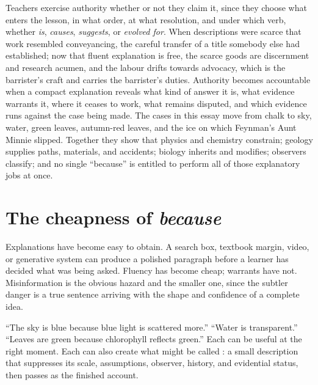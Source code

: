 
\begin{thesisbox}
Teachers exercise authority whether or not they claim it, since they choose what enters the lesson, in what order, at what resolution, and under which verb, whether \emph{is}, \emph{causes}, \emph{suggests}, or \emph{evolved for}. When descriptions were scarce that work resembled conveyancing, the careful transfer of a title somebody else had established; now that fluent explanation is free, the scarce goods are discernment and research acumen, and the labour drifts towards advocacy, which is the barrister's craft and carries the barrister's duties. Authority becomes accountable when a compact explanation reveals what kind of answer it is, what evidence warrants it, where it ceases to work, what remains disputed, and which evidence runs against the case being made. The cases in this essay move from chalk to sky, water, green leaves, autumn-red leaves, and the ice on which Feynman's Aunt Minnie slipped. Together they show that physics and chemistry constrain; geology supplies paths, materials, and accidents; biology inherits and modifies; observers classify; and no single ``because'' is entitled to perform all of those explanatory jobs at once.
\end{thesisbox}

\begingroup
\small
\setlength{\parskip}{0pt}
\tableofcontents
\endgroup
\clearpage

\section{The cheapness of \emph{because}}

Explanations have become easy to obtain. A search box, textbook margin, video, or generative system can produce a polished paragraph before a learner has decided what was being asked. Fluency has become cheap; warrants have not. Misinformation is the obvious hazard and the smaller one, since the subtler danger is a true sentence arriving with the shape and confidence of a complete idea.

``The sky is blue because blue light is scattered more.'' ``Water is transparent.'' ``Leaves are green because chlorophyll reflects green.'' Each can be useful at the right moment. Each can also create what might be called : a small description that suppresses its scale, assumptions, observer, history, and evidential status, then passes as the finished account.

